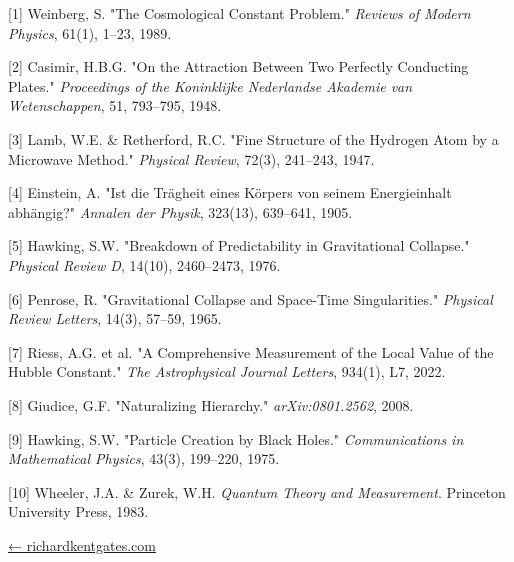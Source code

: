 \documentclass[
  10pt,
]{article}
\begin{document}
{[}1{]} Weinberg, S. "The Cosmological Constant Problem." \emph{Reviews
of Modern Physics}, 61(1), 1--23, 1989.

{[}2{]} Casimir, H.B.G. "On the Attraction Between Two Perfectly
Conducting Plates." \emph{Proceedings of the Koninklijke Nederlandse
Akademie van Wetenschappen}, 51, 793--795, 1948.

{[}3{]} Lamb, W.E. \& Retherford, R.C. "Fine Structure of the Hydrogen
Atom by a Microwave Method." \emph{Physical Review}, 72(3), 241--243,
1947.

{[}4{]} Einstein, A. "Ist die Trägheit eines Körpers von seinem
Energieinhalt abhängig?" \emph{Annalen der Physik}, 323(13), 639--641,
1905.

{[}5{]} Hawking, S.W. "Breakdown of Predictability in Gravitational
Collapse." \emph{Physical Review D}, 14(10), 2460--2473, 1976.

{[}6{]} Penrose, R. "Gravitational Collapse and Space-Time
Singularities." \emph{Physical Review Letters}, 14(3), 57--59, 1965.

{[}7{]} Riess, A.G. et al. "A Comprehensive Measurement of the Local
Value of the Hubble Constant." \emph{The Astrophysical Journal Letters},
934(1), L7, 2022.

{[}8{]} Giudice, G.F. "Naturalizing Hierarchy." \emph{arXiv:0801.2562},
2008.

{[}9{]} Hawking, S.W. "Particle Creation by Black Holes."
\emph{Communications in Mathematical Physics}, 43(3), 199--220, 1975.

{[}10{]} Wheeler, J.A. \& Zurek, W.H. \emph{Quantum Theory and
Measurement}. Princeton University Press, 1983.

\href{https://richardkentgates.com/}{← richardkentgates.com}
\end{document}
